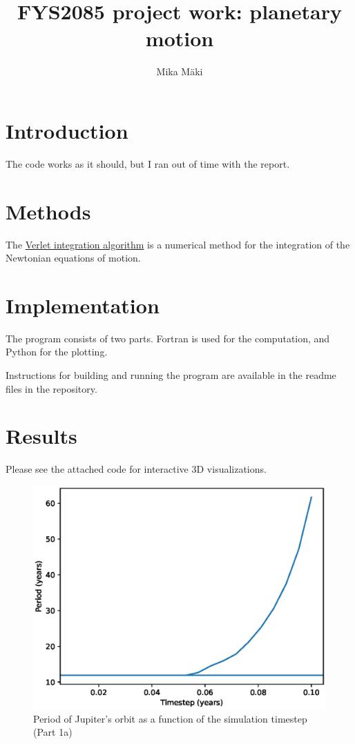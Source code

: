 \documentclass[a4paper]{article}
\title{FYS2085 project work: planetary motion}
\author{Mika Mäki}
\begin{document}
\maketitle
\tableofcontents

\section*{Introduction}
The code works as it should, but I ran out of time with the report.


\section{Methods}
The
\href{https://en.wikipedia.org/wiki/Verlet_integration}{Verlet integration algorithm}
is a numerical method for the integration of the Newtonian equations of motion.



\section{Implementation}
The program consists of two parts.
Fortran is used for the computation, and Python for the plotting.

Instructions for building and running the program are available in the readme files in the repository.


\section{Results}
Please see the attached code for interactive 3D visualizations.

\begin{figure}[ht!]
\includegraphics[width=\textwidth]{fig_1a.eps}
\caption{Period of Jupiter's orbit as a function of the simulation timestep (Part 1a)}
\end{figure}
\end{document}
